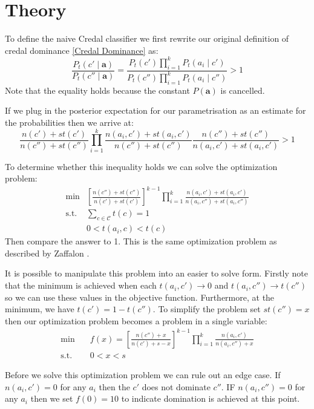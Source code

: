 \section{Theory}

To define the naive Credal classifier we first rewrite our original definition of credal dominance \cref{Credal Dominance} as:
\begin{equation}
	\frac{P_t(c' \mid \mathbf{a})}{P_t(c'' \mid \mathbf{a})} = \frac{P_t(c')\prod_{i=1}^{k}P_t(a_i \mid c')}{P_t(c'')\prod_{i=1}^{k}P_t(a_i \mid c'')} > 1
\end{equation}
Note that the equality holds because the constant $P(\mathbf{a})$ is cancelled.

If we plug in the posterior expectation for our parametrisation as an estimate for the probabilities then we arrive at:
\begin{equation}
	\frac{n(c')+st(c')}{n(c'')+st(c'')} \prod_{i=1}^k \frac{n(a_i, c') + st(a_i , c')}{n(c'') + st(c'')} \frac{n(c'') + st(c'')}{n(a_i, c') + st(a_i , c')} > 1
\end{equation}

To determine whether this inequality holds we can solve the optimization problem:
\begin{align}
	\min & \left[ \frac{n(c'')+st(c'')}{n(c')+st(c')} \right]^{k-1} \prod_{i=1}^k \frac{n(a_i, c') + st(a_i , c')}{n(a_i, c'') + st(a_i , c'')} \\
	\text{s.t.} & \sum_{c \in \mathcal{C}} t(c) = 1 \\
	& 0 < t(a_i, c) < t(c)
\end{align}
Then compare the answer to 1.
This is the same optimization problem as described by Zaffalon \cite{Zaffalon01}.

It is possible to manipulate this problem into an easier to solve form.
Firstly note that the minimum is achieved when each $t(a_i, c') \rightarrow 0$ and $t(a_i, c'') \rightarrow t(c'')$ so we can use these values in the objective function.
Furthermore, at the minimum, we have $t(c') = 1 - t(c'')$.
To simplify the problem set $st(c'') = x$ then our optimization problem becomes a problem in a single variable:
\begin{align} \label{Credal Dominance Test}
	\min \quad & f(x) = \left[ \frac{n(c'') + x}{n(c') + s - x} \right]^{k-1} \prod_{i=1}^k \frac{n(a_i, c')}{n(a_i, c'') + x} \\
	\text{s.t.} \quad & 0 < x < s
\end{align}

Before we solve this optimization problem we can rule out an edge case.
If $n(a_i, c')=0$ for any $a_i$ then the $c'$ does not dominate $c''$.
IF $n(a_i, c'')=0$ for any $a_i$ then we set $f(0)=10$ to indicate domination is achieved at this point.

